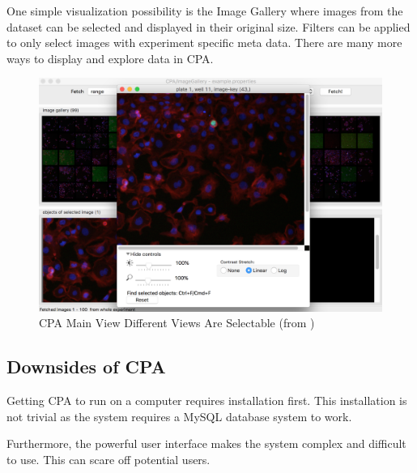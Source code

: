 One simple visualization possibility is the Image Gallery where images from the dataset can be selected and 
displayed in their original size. Filters can be applied to only select images with experiment specific meta data. 
There are many more ways to display and explore data in CPA.

\begin{figure}[H]
	\centering
	\includegraphics[width=1.0\linewidth]{bilder/related_work/visualization.png}
	\caption{CPA Main View Different Views Are Selectable (from \cite{ReactLogo})}
	\label{fig:RL}
\end{figure}


\subsection{Downsides of CPA}
Getting CPA to run on a computer requires installation first. This installation is
not trivial as the system requires a MySQL database system to work.

Furthermore, the powerful user interface makes the system complex and difficult to use. This can 
scare off potential users.





